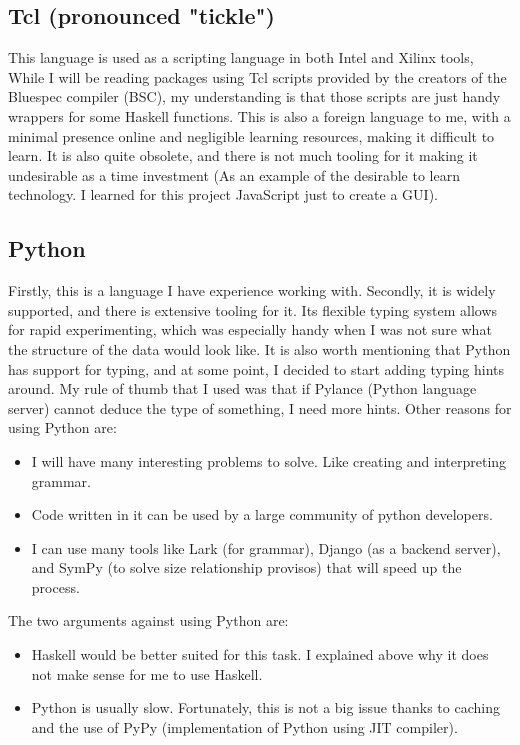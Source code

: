 \documentclass[12pt]{report}
\begin{document}
\subsection{Tcl (pronounced "tickle")}
This language is used as a scripting language in both Intel and Xilinx tools, While I will be reading packages using Tcl scripts provided by the creators of the Bluespec compiler (BSC), my understanding is that those scripts are just handy wrappers for some Haskell functions. This is also a foreign language to me, with a minimal presence online and negligible learning resources, making it difficult to learn. It is also quite obsolete, and there is not much tooling for it making it undesirable as a time investment (As an example of the desirable to learn technology. I learned for this project JavaScript just to create a GUI). 
\subsection{Python}
Firstly, this is a language I have experience working with. Secondly, it is widely supported, and there is extensive tooling for it. Its flexible typing system allows for rapid experimenting, which was especially handy when I was not sure what the structure of the data would look like. It is also worth mentioning that Python has support for typing, and at some point, I decided to start adding typing hints around. My rule of thumb that I used was that if Pylance (Python language server) cannot deduce the type of something, I need more hints.  
Other reasons for using Python are:  
\begin{itemize}  
  \item I will have many interesting problems to solve. Like creating and interpreting grammar.  
  \item Code written in it can be used by a large community of python developers.  
  \item I can use many tools like Lark (for grammar), Django (as a backend server), and SymPy (to solve size relationship provisos) that will speed up the process.  
\end{itemize}  
The two arguments against using Python are:  
\begin{itemize}  
  \item Haskell would be better suited for this task. I explained above why it does not make sense for me to use Haskell.  
  \item Python is usually slow. Fortunately, this is not a big issue thanks to caching and the use of PyPy (implementation of Python using JIT compiler).  
\end{itemize} 
\end{document}
